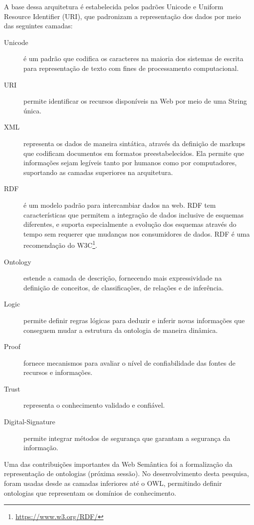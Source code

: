 A base dessa arquitetura é estabelecida pelos padrões \foreignlanguage{english}{Unicode}
e \foreignlanguage{english}{Uniform Resource Identifier} (URI),
que padronizam a representação dos dados por meio das seguintes camadas: 
%
\begin{description}
\item [{Unicode}] \foreignlanguage{brazil}{é um padrão que codifica os
caracteres na maioria dos sistemas de escrita para representação de
texto com fines de processamento computacional.}
\item [{URI}] \foreignlanguage{brazil}{permite identificar os recursos
disponíveis na Web por meio de uma }String\foreignlanguage{brazil}{
única.}
\item [{XML\foreignlanguage{brazil}{}}] \foreignlanguage{brazil}{representa
os dados de maneira sintática, através da definição de }markups\foreignlanguage{brazil}{
que codificam documentos em formatos preestabelecidos. Ela permite
que informações sejam legíveis tanto por humanos como por computadores,
suportando as camadas superiores na arquitetura.}
\item [{RDF}] \foreignlanguage{brazil}{é um modelo padrão para intercambiar
dados na web. }RDF\foreignlanguage{brazil}{ tem características que
permitem a integração de dados inclusive de esquemas diferentes, e
suporta especialmente a evolução dos esquemas através do tempo sem
requerer que mudanças nos consumidores de dados. RDF é uma recomendação
do W3C}\footnote{%
\url{https://www.w3.org/RDF/}%
}\foreignlanguage{brazil}{.}
\item [{Ontology}] \foreignlanguage{brazil}{estende a camada de descrição,
fornecendo mais expressividade na definição de conceitos, de classificações,
de relações e de inferência.}
\item [{Logic}] \foreignlanguage{brazil}{permite definir regras lógicas
para deduzir e inferir novas informações que conseguem mudar a estrutura
da ontologia de maneira dinâmica.}
\item [{Proof}] \foreignlanguage{brazil}{fornece mecanismos para avaliar
o nível de confiabilidade das fontes de recursos e informações.}
\item [{Trust}] \foreignlanguage{brazil}{representa o conhecimento validado
e confiável.}
\item [{Digital-Signature}] \foreignlanguage{brazil}{permite integrar métodos
de segurança que garantam a segurança da informação.}
\end{description}
%
Uma das contribuições importantes da Web Semântica foi a formalização
da representação de ontologias (próxima sessão). No desenvolvimento
desta pesquisa, foram usadas desde as camadas inferiores até o \foreignlanguage{english}{OWL},
permitindo definir ontologias que representam os domínios de conhecimento.

